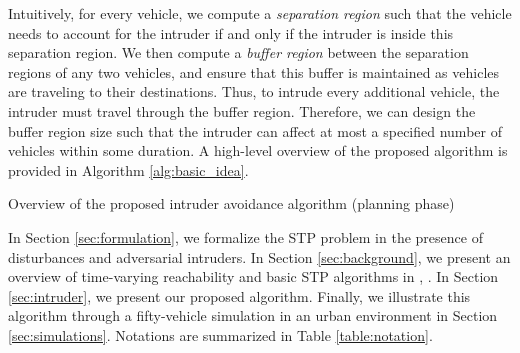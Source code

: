Intuitively, for every vehicle, we compute a \textit{separation region} such that the vehicle needs to account for the intruder if and only if the intruder is inside this separation region. We then compute a \textit{buffer region} between the separation regions of any two vehicles, and ensure that this buffer is maintained as vehicles are traveling to their destinations. Thus, to intrude every additional vehicle, the intruder must travel through the buffer region. Therefore, we can design the buffer region size such that the intruder can affect at most a specified number of vehicles within some duration. A high-level overview of the proposed algorithm is provided in Algorithm \ref{alg:basic_idea}.    
%
\begin{algorithm}[tb]
	\DontPrintSemicolon
	\caption{Overview of the proposed intruder avoidance algorithm (planning phase)}
	\label{alg:basic_idea}
\end{algorithm}
%

In Section \ref{sec:formulation}, we formalize the STP problem in the presence of disturbances and adversarial intruders. In Section \ref{sec:background}, we present an overview of time-varying reachability and basic STP algorithms in \cite{Chen15c}, \cite{Bansal2017}. In Section \ref{sec:intruder}, we present our proposed algorithm. Finally, we illustrate this algorithm through a fifty-vehicle simulation in an urban environment in Section \ref{sec:simulations}. Notations are summarized in Table \ref{table:notation}.